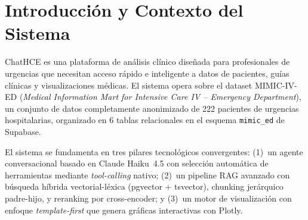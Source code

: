 ﻿\documentclass[11pt,a4paper]{article}
\begin{document}
\tableofcontents
\newpage

\section{Introducci\'on y Contexto del Sistema}

ChatHCE es una plataforma de an\'alisis cl\'inico dise\~nada para profesionales de urgencias que necesitan acceso r\'apido e inteligente a datos de pacientes, gu\'ias cl\'inicas y visualizaciones m\'edicas. El sistema opera sobre el dataset MIMIC-IV-ED (\textit{Medical Information Mart for Intensive Care IV -- Emergency Department}), un conjunto de datos completamente anonimizado de 222 pacientes de urgencias hospitalarias, organizado en 6 tablas relacionales en el esquema \texttt{mimic\_ed} de Supabase.

El sistema se fundamenta en tres pilares tecnol\'ogicos convergentes: (1)~un agente conversacional basado en Claude Haiku~4.5 con selecci\'on autom\'atica de herramientas mediante \textit{tool-calling} nativo; (2)~un pipeline RAG avanzado con b\'usqueda h\'ibrida vectorial-l\'exica (pgvector + tsvector), chunking jer\'arquico padre-hijo, y reranking por cross-encoder; y (3)~un motor de visualizaci\'on con enfoque \textit{template-first} que genera gr\'aficas interactivas con Plotly.
\end{document}
